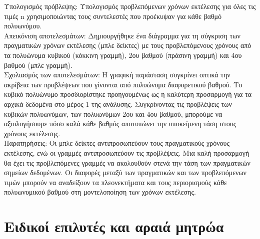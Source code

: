 \documentclass[12pt,a4paper]{article}
\begin{document}
Υπολογισμός πρόβλεψης: Υπολογισμός προβλεπόμενων χρόνων εκτέλεσης για όλες τις τιμές n χρησιμοποιώντας τους συντελεστές που προέκυψαν για κάθε βαθμό πολυωνύμου.\\

Απεικόνιση αποτελεσμάτων: Δημιουργήθηκε ένα διάγραμμα για τη σύγκριση των πραγματικών χρόνων εκτέλεσης (μπλε δείκτες) με τους προβλεπόμενους χρόνους από τα πολυώνυμα κυβικού (κόκκινη γραμμή), 2ου βαθμού (πράσινη γραμμή) και 4ου βαθμού (μπλε γραμμή).\\

Σχολιασμός των αποτελεσμάτων: Η γραφική παράσταση συγκρίνει οπτικά την ακρίβεια των προβλέψεων που γίνονται από πολυώνυμα διαφορετικού βαθμού. Το κυβικό πολυώνυμο προσδιορίστηκε προηγουμένως ως η καλύτερη προσαρμογή για τα αρχικά δεδομένα στο μέρος 1 της ανάλυσης. Συγκρίνοντας τις προβλέψεις των κυβικών πολυωνύμων, των πολυωνύμων 2ου και 4ου βαθμού, μπορούμε να αξιολογήσουμε πόσο καλά κάθε βαθμός αποτυπώνει την υποκείμενη τάση στους χρόνους εκτέλεσης.\\

Παρατηρήσεις: Οι μπλε δείκτες αντιπροσωπεύουν τους πραγματικούς χρόνους εκτέλεσης, ενώ οι γραμμές αντιπροσωπεύουν τις προβλέψεις. Μια καλή προσαρμογή θα έχει τις προβλεπόμενες γραμμές να ακολουθούν στενά την τάση των πραγματικών σημείων δεδομένων. Οι διαφορές μεταξύ των πραγματικών και των προβλεπόμενων τιμών μπορούν να αναδείξουν τα πλεονεκτήματα και τους περιορισμούς κάθε πολυωνυμικού βαθμού στη μοντελοποίηση των χρόνων εκτέλεσης.

\section{Ειδικοί επιλυτές και αραιά μητρώα}
\end{document}
